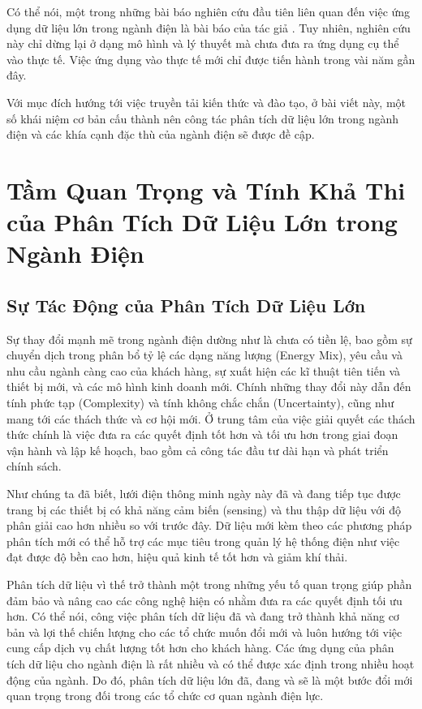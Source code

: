 \documentclass[utf8]{frontiersSCNS} %
\begin{document}
Có thể nói, một trong những bài báo nghiên cứu đầu tiên liên quan đến việc ứng dụng dữ liệu lớn trong ngành điện là bài báo của tác giả \cite{Kezunovic2013}. Tuy nhiên, nghiên cứu này chỉ dừng lại ở dạng mô hình và lý thuyết mà chưa đưa ra ứng dụng cụ thể vào thực tế. Việc ứng dụng vào thực tế mới chỉ được tiến hành trong vài năm gần đây.

Với mục đích hướng tới việc truyền tải kiến thức và đào tạo, ở bài viết này, một số khái niệm cơ bản cấu thành nên công tác phân tích dữ liệu lớn trong ngành điện và các khía cạnh đặc thù của ngành điện sẽ được đề cập. 

\section{Tầm Quan Trọng và Tính Khả Thi của Phân Tích Dữ Liệu Lớn trong Ngành Điện}
\subsection{Sự Tác Động của Phân Tích Dữ Liệu Lớn}

Sự thay đổi mạnh mẽ trong ngành điện dường như là chưa có tiền lệ, bao gồm sự chuyển dịch trong phân bổ tỷ lệ các dạng năng lượng (Energy Mix), yêu cầu và nhu cầu ngành càng cao của khách hàng, sự xuất hiện các kĩ thuật tiên tiến và thiết bị mới, và các mô hình kinh doanh mới. Chính những thay đổi này dẫn đến tính phức tạp (Complexity) và tính không chắc chắn (Uncertainty), cũng như mang tới các thách thức và cơ hội mới. Ở trung tâm của việc giải quyết các thách thức chính là việc đưa ra các quyết định tốt hơn và tối ưu hơn trong giai đoạn vận hành và lập kế hoạch, bao gồm cả công tác đầu tư dài hạn và phát triển chính sách.

Như chúng ta đã biết, lưới điện thông minh ngày này đã và đang tiếp tục được trang bị các thiết bị có khả năng cảm biến (sensing) và thu thập dữ liệu với độ phân giải cao hơn nhiều so với trước đây. Dữ liệu mới kèm theo các phương pháp phân tích mới có thể hỗ trợ các mục tiêu trong quản lý hệ thống điện như việc đạt được độ bền cao hơn, hiệu quả kinh tế tốt hơn và giảm khí thải. 

Phân tích dữ liệu vì thế trở thành một trong những yếu tố quan trọng giúp phần đảm bảo và nâng cao các công nghệ hiện có nhằm đưa ra các quyết định tối ưu hơn. Có thể nói, công việc phân tích dữ liệu đã và đang trở thành khả năng cơ bản và lợi thế chiến lượng cho các tổ chức muốn đổi mới và luôn hướng tới việc cung cấp dịch vụ chất lượng tốt hơn cho khách hàng. Các ứng dụng của phân tích dữ liệu cho ngành điện là rất nhiều và có thể được xác định trong nhiều hoạt động của ngành. Do đó, phân tích dữ liệu lớn đã, đang và sẽ là một bước đổi mới quan trọng trong đối trong các tổ chức cơ quan ngành điện lực.
\end{document}
